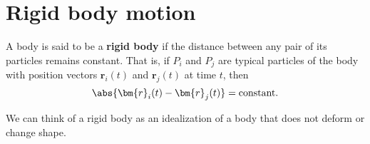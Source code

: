 \documentclass[12pt, a4paper]{article}
\begin{document}





\section{Rigid body motion}

\begin{definition}
    A body is said to be a \textbf{rigid body} if the distance between any pair of its particles remains constant. That is, if \(P_i\) and \(P_j\) are typical particles of the body with position vectors \(\bm{r}_i(t)\) and \(\bm{r}_j(t)\) at time \(t\), then 
    \[\abs{\bm{r}_i(t)-\bm{r}_j(t)} = \text{constant}.\]
\end{definition}

\begin{mdnote}
    We can think of a rigid body as an idealization of a body that does not deform or change shape.
\end{mdnote}
\end{document}
